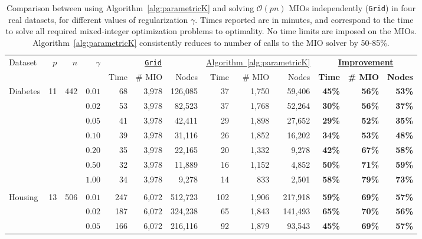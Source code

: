 \documentclass[opre,nonblindrev]{informs3} %
\begin{document}
{\begin{center}
	\begin{table}[h!]\footnotesize
 \caption{Comparison between using Algorithm~\ref{alg:parametricK} and solving $\mathcal{O}(pn)$ MIOs independently (\texttt{Grid}) in four real datasets, for different values of regularization $\gamma$. Times reported are in minutes, and correspond to the time to solve all required mixed-integer optimization problems to optimality. No time limits are imposed on the MIOs. Algorithm~\ref{alg:parametricK} consistently reduces to number of calls to the MIO solver by 50-85\%.}
 \label{tab:gridVsAlg}
	\setlength{\tabcolsep}{2pt}
	\begin{tabular}{l r r r|r r r | r r r  | r r r }
		
		\hline
		\multirow{2}{*}{Dataset}&\multirow{2}{*}{$p$}&\multirow{2}{*}{$n$}&\multirow{2}{*}{$\gamma$}& \multicolumn{3}{c|}{\underline{\texttt{Grid}}}&\multicolumn{3}{c|}{\underline{Algorithm~\ref{alg:parametricK}}}&\multicolumn{3}{c}{\textbf{\underline{Improvement}}}\\
		&&&&Time&\# MIO&Nodes&Time&\# MIO&Nodes&\textbf{Time}&\textbf{\# MIO}&\textbf{Nodes}\\
		\hline
			\multirow{7}{*}{Diabetes}&\multirow{7}{*}{11}&\multirow{7}{*}{442}&
		$0.01$&68&3,978&126,085&37&1,750&59,406&\textbf{45\%}&\textbf{56\%}&\textbf{53\%}\\
		&&&$0.02$&53&3,978&82,523&37&1,768&52,264&\textbf{30\%}&\textbf{56\%}&\textbf{37\%}\\
		&&&$0.05$&41&3,978&42,411&29&1,898&27,652&\textbf{29\%}&\textbf{52\%}&\textbf{35\%}\\
		&&&$0.10$&39&3,978&31,116&26&1,852&16,202&\textbf{34\%}&\textbf{53\%}&\textbf{48\%}\\
		&&&$0.20$&35&3,978&22,165&20&1,332&9,278&\textbf{42\%}&\textbf{67\%}&\textbf{58\%}\\
		&&&$0.50$&32&3,978&11,889&16&1,152&4,852&\textbf{50\%}&\textbf{71\%}&\textbf{59\%}\\
		&&&$1.00$&34&3,978&9,278&14&833&2,501&\textbf{58\%}&\textbf{79\%}&\textbf{73\%}\\
		&&&&&&&&&&&&\\
		\multirow{7}{*}{Housing}&\multirow{7}{*}{13}&\multirow{7}{*}{506}&
		$0.01$&247&6,072&512,723&102&1,906&217,918&\textbf{59\%}&\textbf{69\%}&\textbf{57\%}\\
		&&&$0.02$&187&6,072&324,238&65&1,843&141,493&\textbf{65\%}&\textbf{70\%}&\textbf{56\%}\\
		&&&$0.05$&166&6,072&216,116&92&1,879&93,543&\textbf{45\%}&\textbf{69\%}&\textbf{57\%}\\

\end{tabular}
\end{table}
\end{center}}
\end{document}
